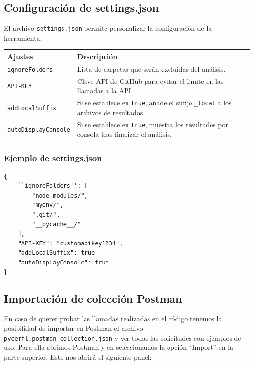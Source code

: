 \documentclass[a4paper, 12pt]{book}
\begin{document}
\subsection{Configuración de settings.json}
El archivo \texttt{settings.json} permite personalizar la configuración de la herramienta:
\vspace{1em}

\begin{tabular}{|l|p{10cm}|} %
\hline
\textbf{Ajustes} & \textbf{Descripción} \\
\hline
\texttt{ignoreFolders} & Lista de carpetas que serán excluidas del análisis. \\
\texttt{API-KEY} & Clave API de GitHub para evitar el límite en las llamadas a la API. \\
\texttt{addLocalSuffix} & Si se establece en \texttt{true}, añade el sufijo \texttt{\_local} a los archivos de resultados. \\
\texttt{autoDisplayConsole} & Si se establece en \texttt{true}, muestra los resultados por consola tras finalizar el análisis. \\
\hline
\end{tabular}

\vspace{1em}
\subsubsection{Ejemplo de settings.json}
\begin{verbatim}
{
    ``ignoreFolders'': [
        "node_modules/",
        "myenv/",
        ".git/",
        "__pycache__/"
    ],
    "API-KEY": "customapikey1234",
    "addLocalSuffix": true
    "autoDisplayConsole": true
}
\end{verbatim}

\subsection{Importación de colección Postman}

En caso de querer probar las llamadas realizadas en el código tenemos la posibilidad de importar en Postman el archivo \texttt{pycerfl.postman\_collection.json} y ver todas las solicitudes con ejemplos de uso. Para ello abrimos Postman y en seleccionamos la opción ``Import'' en la parte superior. Esto nos abrirá el siguiente panel:
\end{document}
